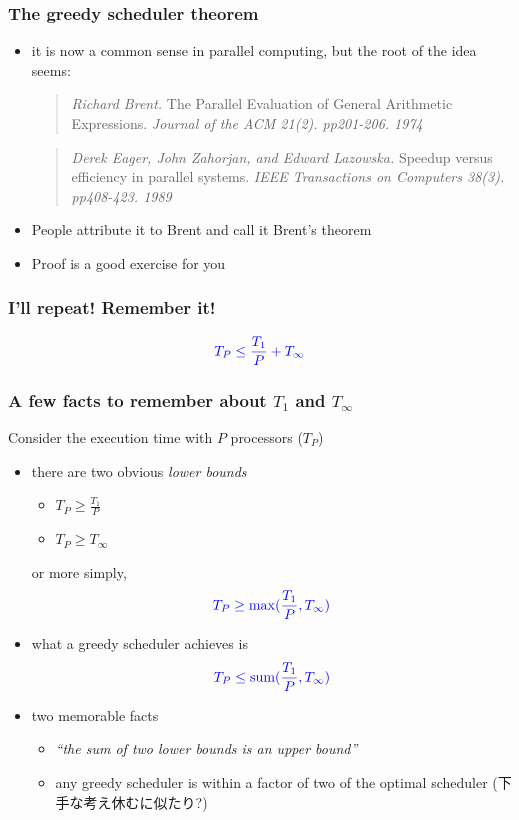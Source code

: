 \documentclass[12pt,dvipdfmx]{beamer}
\newcommand{\ao}[1]{{\color{blue}#1}}
\begin{document}
\begin{frame}
\frametitle{The greedy scheduler theorem}
\begin{itemize}
\item it is now a common sense in parallel computing, but
the root of the idea seems:

\begin{quote}
{\em Richard Brent.}
The Parallel Evaluation of General Arithmetic Expressions.
{\em Journal of the ACM 21(2). pp201-206. 1974}
\end{quote}

\begin{quote}
{\em Derek Eager, John Zahorjan, and Edward Lazowska.}
  Speedup versus efficiency in parallel systems.
{\em IEEE Transactions on Computers 38(3). pp408-423. 1989}
\end{quote}

\item People attribute it to Brent and call it 
  \ao{Brent's theorem}

\item Proof is a good exercise for you
\end{itemize}
\end{frame}

\begin{frame}
\frametitle{I'll repeat! Remember it!}


{\huge \[ \ao{T_P \leq \frac{T_1}{P} + T_\infty} \]}

\end{frame}


\begin{frame}
\frametitle{A few facts to remember about $T_1$ and $T_\infty$}
Consider the execution time with $P$ processors ($T_P$)
\begin{itemize}
\item there are two obvious {\it lower bounds}
  \begin{itemize}
  \item \ao{$T_P \geq \frac{T_1}{P}$}
  \item \ao{$T_P \geq T_\infty$}
  \end{itemize}
  or more simply,
\[ \ao{T_P \geq \max(\frac{T_1}{P}, T_\infty)} \]

\item what a greedy scheduler achieves is
  \[ \ao{T_P \leq \mbox{sum}(\frac{T_1}{P}, T_\infty)} \]
\item two memorable facts
  \begin{itemize}
  \item {\it ``the sum of two lower bounds is an upper bound''}
  \item any greedy scheduler is
    within a factor of two of the optimal scheduler
    (下手な考え休むに似たり?)
  \end{itemize}
\end{itemize}
\end{frame}
\end{document}
